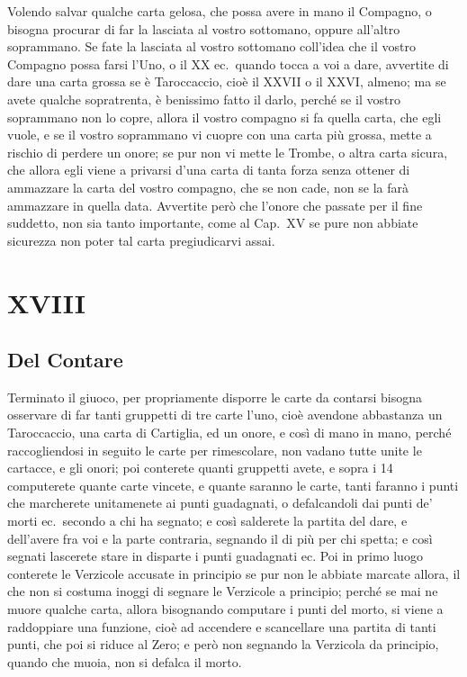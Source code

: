 \documentclass[11pt,a6paper]{article}
\begin{document}
Volendo salvar qualche carta gelosa,
che possa avere in mano il Compagno, o bisogna procurar di far la lasciata al vostro sottomano, oppure all'altro soprammano. Se fate la lasciata al vostro sottomano coll'idea che il vostro Compagno possa farsi l'Uno, o il XX ec.\ quando tocca a voi a dare, avvertite di dare una carta grossa se è Taroccaccio, cioè il XXVII o il XXVI, almeno; ma se avete qualche sopratrenta, è benissimo fatto il darlo, perché se il vostro soprammano non lo copre, allora il vostro compagno si fa quella carta, che egli vuole, e se il vostro soprammano vi cuopre con una carta più grossa, mette a rischio di perdere un onore; se pur non vi mette le Trombe, o altra carta sicura, che allora egli viene a privarsi d'una carta di tanta forza senza ottener di ammazzare la carta del vostro compagno, che se non cade, non se la farà ammazzare in quella data. Avvertite però che l'onore che passate per il fine suddetto, non sia tanto importante, come al Cap.\ XV se pure non abbiate sicurezza non poter tal carta pregiudicarvi assai.

\section{XVIII}
\subsection*{Del Contare}

Terminato il giuoco, per propriamente disporre le carte da contarsi bisogna osservare di far tanti gruppetti di tre carte l'uno, cioè avendone abbastanza un Taroccaccio, una carta di Cartiglia, ed un onore, e così di mano in mano, perché raccogliendosi in seguito le carte per rimescolare, non vadano tutte unite le cartacce, e gli onori; poi conterete quanti gruppetti avete, e sopra i 14 computerete quante carte vincete, e quante saranno le carte, tanti faranno i punti che marcherete unitamenete ai punti guadagnati, o defalcandoli dai punti de' morti ec.\ secondo a chi ha segnato; e così salderete la partita del dare, e dell'avere fra voi e la parte contraria, segnando il di più per chi spetta; e così segnati lascerete stare in disparte i punti guadagnati ec. Poi in primo luogo conterete le Verzicole accusate in principio se pur non le abbiate marcate allora, il che non si costuma inoggi di segnare le Verzicole a principio; perché se mai ne muore qualche carta, allora bisognando computare i punti del morto, si viene a raddoppiare una funzione, cioè ad accendere e scancellare una partita di tanti 
punti, che poi si riduce al Zero; e però non segnando la Verzicola da principio, quando che muoia, non si defalca il morto.
\end{document}
